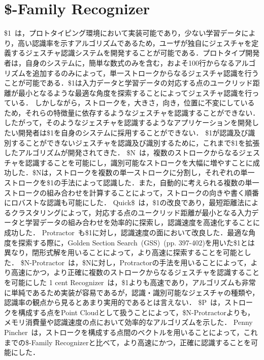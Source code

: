 \section{\$-Family Recognizer}
\$1~\cite{Wobbrock:2007:GWL:1294211.1294238}は，プロトタイピング環境において実装可能であり，少ない学習データにより，高い認識率を示すアルゴリズムであるため，ユーザが独自にジェスチャを定義するジェスチャ認識システムを開発することが可能である．プロトタイプ開発者は，自身のシステムに，簡単な数式のみを含む，およそ100行からなるアルゴリズムを追加するのみによって，単一ストロークからなるジェスチャ認識を行うことが可能である．\$1は入力データと学習データの対応する点のユークリッド距離が最小となるような最適な角度を探索することによってジェスチャ認識を行っている．
しかしながら，ストロークを，大きさ，向き，位置に不変にしているため，それらの特徴量に依存するようなジェスチャを認識することができない．したがって，そのようなジェスチャを認識するようなアプリケーションを開発したい開発者は\$1を自身のシステムに採用することができない．
\$1が認識及び識別することができないジェスチャを認識及び識別するために，これまで\$1を拡張したアルゴリズムが開発されてきた．
\$N~\cite{Anthony:2010:LMR:1839214.1839258}は，複数のストロークからなるジェスチャを認識することを可能にし，識別可能なストロークを大幅に増やすことに成功した．\$Nは，ストロークを複数の単一ストロークに分割し，それぞれの単一ストロークを\$1の手法によって認識した．また，自動的に考えられる複数の単一ストロークの組み合わせを計算することによって，ストロークの向きや書く順番にロバストな認識も可能にした．
Quick\$~\cite{Reaver:2011:MQU:2021164.2021183}は，\$1の改良であり，最短距離法によるクラスタリングによって，対応する点のユークリッド距離が最小となる入力データと学習データの組み合わせを効率的に探索し，認識速度を高速化することに成功した．
Protractor~\cite{Li:2010:PFA:1753326.1753654}も\$1に対し，認識速度の面において改良した．最適な角度を探索する際に，Golden Section Search~(GSS)~\cite{Press:1992:NRC:148286}(pp. 397-402)を用いた\$1とは異なり，閉形式解を用いることによって，より高速に探索することを可能とした．
\$N-Protractor~\cite{Anthony:2012:NFA:2305276.2305296}は，\$Nに対し，Protractorの手法を用いることによって，より高速にかつ，より正確に複数のストロークからなるジェスチャを認識することを可能にした
1 cent Recognizer~\cite{Herold:2012:CRF:2331067.2331074}は，\$1よりも高速であり，アルゴリズムも非常に単純であるため実装が容易であるが，認識・識別可能なジェスチャの種類や，認識率の観点から見るとあまり実用的であるとは言えない．
\$P~\cite{Vatavu:2012:GPC:2388676.2388732}は，ストロークを構成する点をPoint Cloudとして扱うことによって，\$N-Protractorよりも，メモリ消費量や認識速度の点において効率的なアルゴリズムを示した．
Penny Pincher~\cite{Taranta:2015:PPB:2788890.2788925}は，ストロークを構成する点間のベクトルを用いることによって，これまでの\$-Family Recognizerと比べて，より高速にかつ，正確に認識することを可能にした．


